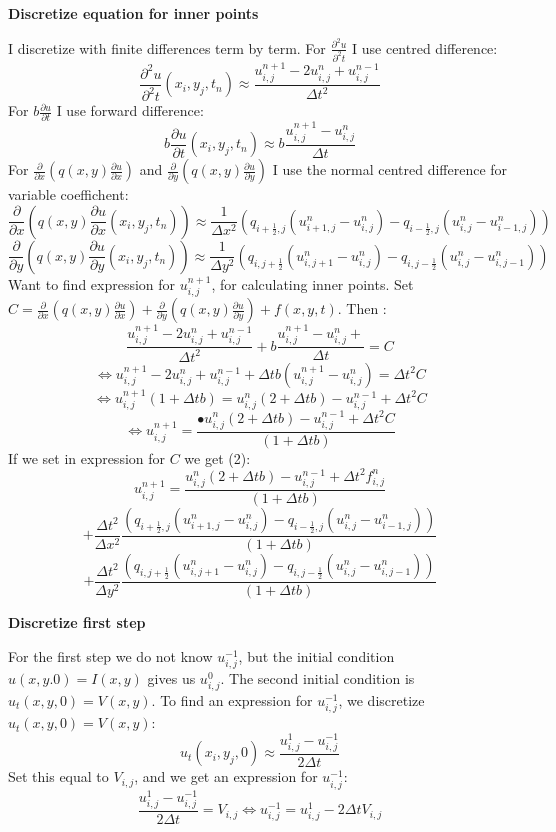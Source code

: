\documentclass[11pt,a4paper]{report}
\begin{document}
\begin{center}
\Large \textbf{Discretize equation for inner points}
\Large


\end{center}  
I discretize with finite differences term by term. For $ \frac{\partial^2 u}{\partial^2 t}$ I use centred difference: $$\frac{\partial^2 u}{\partial^2 t}(x_i,y_j,t_n) \approx \frac{u_{i,j}^{n+1}-2u_{i,j}^n+u_{i,j}^{n-1}}{\Delta t^2} $$ For $b\frac{\partial u}{\partial t}$ I use forward difference: $$b\frac{\partial u}{\partial t}(x_i,y_j,t_n) \approx b\frac{u_{i,j}^{n+1}-u_{i,j}^n}{\Delta t} $$ For $\frac{\partial }{\partial x}(q(x,y)\frac{\partial u}{\partial x})$ and $ \frac{\partial }{\partial y}(q(x,y)\frac{\partial u}{\partial y})$ I use the normal centred difference for variable coeffichent: $$\frac{\partial }{\partial x}(q(x,y)\frac{\partial u}{\partial x}(x_i,y_j,t_n)) \approx \frac{1}{\Delta x^2}(q_{i+\frac{1}{2},j}(u_{i+1,j}^{n}-u_{i,j}^{n})-q_{i-\frac{1}{2},j}(u_{i,j}^{n}-u_{i-1,j}^{n}))$$ 
$$\frac{\partial }{\partial y}(q(x,y)\frac{\partial u}{\partial y}(x_i,y_j,t_n)) \approx \frac{1}{\Delta y^2}(q_{i,j+\frac{1}{2}}(u_{i,j+1}^{n}-u_{i,j}^{n})-q_{i,j-\frac{1}{2}}(u_{i,j}^{n}-u_{i,j-1}^{n}))$$
Want to find expression for $u_{i,j}^{n+1}$, for calculating inner points. Set $C=\frac{\partial }{\partial x}(q(x,y)\frac{\partial u}{\partial x}) +\frac{\partial }{\partial y}(q(x,y)\frac{\partial u}{\partial y})+f(x,y,t)$. Then : $$ \frac{u_{i,j}^{n+1}-2u_{i,j}^n+u_{i,j}^{n-1}}{\Delta t^2} + b\frac{u_{i,j}^{n+1}-u_{i,j}^n+}{\Delta t} =C $$ $$ \iff u_{i,j}^{n+1}-2u_{i,j}^n+u_{i,j}^{n-1} +\Delta t b(u_{i,j}^{n+1}-u_{i,j}^n)=\Delta t^2 C $$ $$ \iff u_{i,j}^{n+1}(1+\Delta t b)=u_{i,j}^n(2+\Delta t b)-u_{i,j}^{n-1}+\Delta t^2 C$$ $$\iff u_{i,j}^{n+1}=\frac{•u_{i,j}^n(2+\Delta t b)-u_{i,j}^{n-1}+\Delta t^2 C}{(1+\Delta t b)} $$  If we set in expression for $C$ we get (2): $$u_{i,j}^{n+1}=\frac{u_{i,j}^n(2+\Delta t b)-u_{i,j}^{n-1}+\Delta t^2 f_{i,j}^n}{(1+\Delta t b)} $$ $$ + \frac{\Delta t^2}{\Delta x^2}\frac{(q_{i+\frac{1}{2},j}(u_{i+1,j}^{n}-u_{i,j}^{n})-q_{i-\frac{1}{2},j}(u_{i,j}^{n}-u_{i-1,j}^{n}))}{(1+\Delta t b)} $$ $$+ \frac{\Delta t^2}{\Delta y^2}\frac{(q_{i,j+\frac{1}{2}}(u_{i,j+1}^{n}-u_{i,j}^{n})-q_{i,j-\frac{1}{2}}(u_{i,j}^{n}-u_{i,j-1}^{n}))}{(1+\Delta t b)} $$
\begin{center}
\Large \textbf{Discretize first step}
\Large


\end{center}
For the first step we do not know $u_{i,j}^{-1} $, but the initial condition $u(x,y.0)=I(x,y)$ gives us $u_{i,j}^{0}$. The second initial condition is $u_t(x,y,0)=V(x,y)$. To find an expression for $u_{i,j}^{-1}$, we discretize $u_t(x,y,0)=V(x,y)$: $$u_t(x_i,y_j,0) \approx \frac{u_{i,j}^{1}-u_{i,j}^{-1}}{2\Delta t}$$ Set this equal to $V_{i,j}$, and we get an expression for $u_{i,j}^{-1} $: $$\frac{u_{i,j}^{1}-u_{i,j}^{-1}}{2\Delta t} =V_{i,j} \iff u_{i,j}^{-1} = u_{i,j}^{1} -2\Delta t V_{i,j} $$  
\end{document}
